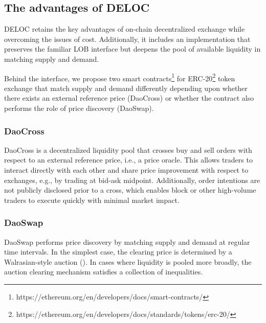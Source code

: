 \documentclass[11pt, reqno]{amsart}
\theoremstyle{definition}
\theoremstyle{remark}
\begin{document}
\subsection{The advantages of DELOC}

DELOC retains the key advantages of on-chain decentralized exchange while
overcoming the issues of cost. Additionally, it includes an implementation
that preserves the familiar LOB interface but deepens the pool of available
liquidity in matching supply and demand.

Behind the interface, we propose two smart
contracts\footnote{https://ethereum.org/en/developers/docs/smart-contracts/}
for
ERC-20\footnote{https://ethereum.org/en/developers/docs/standards/tokens/erc-20/}
token exchange that match supply and demand differently depending upon whether
there exists an external reference price (DaoCross) or whether the contract
also performs the role of price discovery (DaoSwap).

\subsubsection{DaoCross}
DaoCross is a decentralized liquidity pool that crosses buy and sell orders
with respect to an external reference price, i.e., a price oracle. This allows
traders to interact directly with each other and share price improvement with
respect to exchanges, e.g., by trading at bid-ask midpoint. Additionally, order
intentions are not publicly disclosed prior to a cross, which enables block or
other high-volume traders to execute quickly with minimal market impact.

\subsubsection{DaoSwap}
DaoSwap performs price discovery by matching supply and demand at regular time
intervals. In the simplest case, the clearing price is determined by a
Walrasian-style auction (\cite{Wa}). In cases where liquidity is pooled more
broadly, the auction clearing mechanism satisfies a collection of inequalities.
\end{document}
